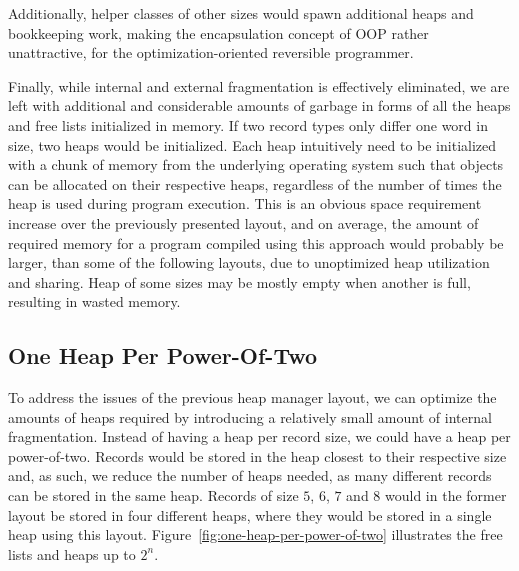 Additionally, helper classes of other sizes would spawn additional heaps and bookkeeping work, making the encapsulation concept of OOP rather unattractive, for the optimization-oriented reversible programmer. 

Finally, while internal and external fragmentation is effectively eliminated, we are left with additional and considerable amounts of garbage in forms of all the heaps and free lists initialized in memory. If two record types only differ one word in size, two heaps would be initialized. Each heap intuitively need to be initialized with a chunk of memory from the underlying operating system such that objects can be allocated on their respective heaps, regardless of the number of times the heap is used during program execution. This is an obvious space requirement increase over the previously presented layout, and on average, the amount of required memory for a program compiled using this approach would probably be larger, than some of the following layouts, due to unoptimized heap utilization and sharing. Heap of some sizes may be mostly empty when another is full, resulting in wasted memory.


\subsection{One Heap Per Power-Of-Two}
\label{subsec:one-heap-per-power-of-two}
To address the issues of the previous heap manager layout, we can optimize the amounts of heaps required by introducing a relatively small amount of internal fragmentation. Instead of having a heap per record size, we could have a heap per power-of-two. Records would be stored in the heap closest to their respective size and, as such, we reduce the number of heaps needed, as many different records can be stored in the same heap. Records of size $5$, $6$, $7$ and $8$ would in the former layout be stored in four different heaps, where they would be stored in a single heap using this layout. Figure~\ref{fig:one-heap-per-power-of-two} illustrates the free lists and heaps up to $2^n$. 

